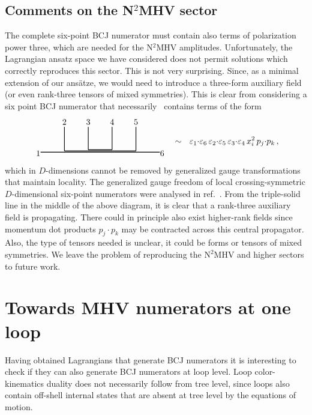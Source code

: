 \documentclass[11pt,a4paper]{article}
\newcommand{\z}{x}
\begin{document}
\subsection{Comments on the N${}^2$MHV sector}
The complete six-point BCJ numerator must contain also terms of polarization power three, which are needed for the N{}$^2$MHV amplitudes. Unfortunately, the Lagrangian ansatz space we have considered does not permit solutions which correctly reproduces this sector. This is not very surprising. Since, as a minimal extension of our ans\"{a}tze, we would need to introduce a three-form auxiliary field (or even rank-three tensors of mixed symmetries). This is clear from considering a six point BCJ numerator that necessarily~\cite{Chen:2021chy} contains terms of the form
\begin{equation}
\begin{tikzpicture}[baseline={(0, +0.3cm)}]
\draw[thick] (-2.5,-0.05) -- (2.5,-0.05);
\draw[thick] (-1.5,0) -- (1.5,0);
\draw[thick] (1.5,0) -- (1.5,1);
\draw[thick] (-1.5,0) -- (-1.5,1);
\draw[thick] (.5,0.05) -- (0.5,1);
\draw[thick] (-.5,0.05) -- (-.5,1);
\draw[thick] (-.5,0.05) -- (.5,0.05);
\node at (-2.6,-0.1) {$1$};
\node at (-1.5,1.2) {$2$};
\node at (-.5,1.2) {$3$};
\node at (.5,1.2) {$4$};
\node at (1.5,1.2) {$5$};
\node at (2.6,-0.1) {$6$};
\end{tikzpicture} 
     \ \ \sim\ \ 
     \varepsilon_1{\cdot} \varepsilon_6\, \varepsilon_2{\cdot} \varepsilon_5\, \varepsilon_3{\cdot}\varepsilon_4 \,\z_i^2 \, p_j{\cdot} p_k \, ,
\end{equation}
which in $D$-dimensions cannot be removed by generalized gauge transformations that maintain locality. The generalized gauge freedom of local crossing-symmetric $D$-dimensional six-point numerators were analysed in ref.~\cite{Chen:2021chy}. From the triple-solid line in the middle of the above diagram, it is clear that a rank-three auxiliary field is propagating. There could in principle also exist higher-rank fields since momentum dot products $p_j{\cdot} p_k$ may be contracted across this central propagator. Also, the type of tensors needed is unclear, it could be forms or tensors of mixed symmetries. We leave the problem of reproducing the $\text{N}^2$MHV and higher sectors to future work.

\section{Towards MHV numerators at one loop\label{sec:one-loop}}
Having obtained Lagrangians that generate BCJ numerators it is interesting to check if they can also generate BCJ numerators at loop level. Loop color-kinematics duality does not necessarily follow from tree level, since loops also contain off-shell internal states that are absent at tree level by the equations of motion. 
\end{document}
